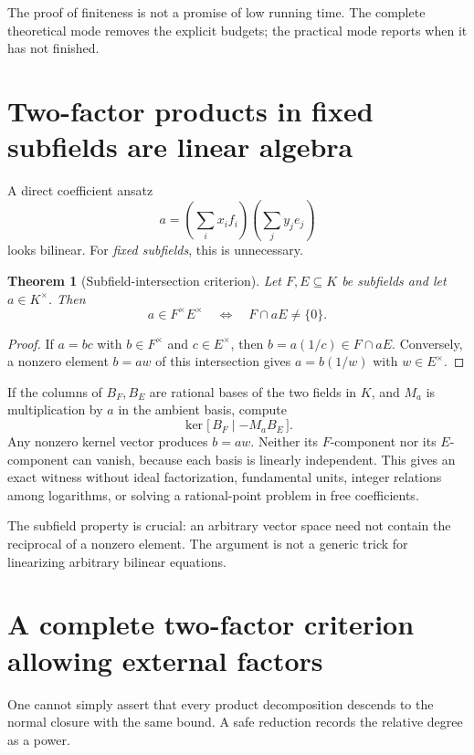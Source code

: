 \documentclass[11pt,a4paper]{article}
\newtheorem{theorem}{Theorem}[section]
\theoremstyle{definition}\newtheorem{definition}[theorem]{Definition}
\theoremstyle{remark}\newtheorem{remark}[theorem]{Remark}
\begin{document}
The proof of finiteness is not a promise of low running time. The complete theoretical mode removes the explicit budgets; the practical mode reports when it has not finished.

\section{Two-factor products in fixed subfields are linear algebra}
\label{sec:fixedproduct}
A direct coefficient ansatz
\[
 a=\left(\sum_i x_i f_i\right)\left(\sum_j y_j e_j\right)
\]
looks bilinear. For \emph{fixed subfields}, this is unnecessary.

\begin{theorem}[Subfield-intersection criterion]
\label{thm:intersectionproduct}
Let $F,E\subseteq K$ be subfields and let $a\in K^\times$. Then
\[
 a\in F^\times E^\times
 \quad\Longleftrightarrow\quad F\cap aE\ne\{0\}.
\]
\end{theorem}
\begin{proof}
If $a=bc$ with $b\in F^\times$ and $c\in E^\times$, then $b=a(1/c)\in F\cap aE$. Conversely, a nonzero element $b=aw$ of this intersection gives $a=b(1/w)$ with $w\in E^\times$.
\end{proof}

If the columns of $B_F,B_E$ are rational bases of the two fields in $K$, and $M_a$ is multiplication by $a$ in the ambient basis, compute
\begin{equation}
 \ker\bigl[\,B_F\mid -M_aB_E\,\bigr].
 \label{eq:productkernel}
\end{equation}
Any nonzero kernel vector produces $b=aw$. Neither its $F$-component nor its $E$-component can vanish, because each basis is linearly independent. This gives an exact witness without ideal factorization, fundamental units, integer relations among logarithms, or solving a rational-point problem in free coefficients.

The subfield property is crucial: an arbitrary vector space need not contain the reciprocal of a nonzero element. The argument is not a generic trick for linearizing arbitrary bilinear equations.

\section{A complete two-factor criterion allowing external factors}
\label{sec:globalbinary}
One cannot simply assert that every product decomposition descends to the normal closure with the same bound. A safe reduction records the relative degree as a power.
\end{document}

